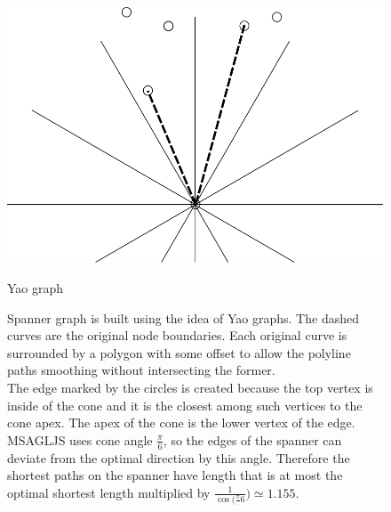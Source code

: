 \documentclass{gd-llncs}
\begin{document}
\begin{figure}[]
  \centering
  \begin{minipage}[b]{0.5\textwidth}
    \includegraphics[width=\textwidth]{yao.pdf}
    \caption{\small{Yao graph}}
    \label{fig:yao}
  \end{minipage}

  \vfill
  \begin{minipage}[b]{\textwidth}
    
    \caption{\small{Spanner graph is built using the idea of Yao graphs. The dashed curves are the original node boundaries. Each original curve is surrounded by a polygon with some offset to allow the polyline paths smoothing without intersecting the former. \\
      The edge marked by the circles is created because the top vertex is inside of the cone and it is the closest among such vertices to the cone apex. The apex of the cone is the lower vertex of the edge. \\MSAGLJS uses cone angle $\frac{\pi}{6}$, so the edges of the spanner can deviate from the optimal direction by this angle. Therefore the shortest paths on the spanner have length that is at most the optimal shortest length multiplied by $\frac{1}{\cos(\frac{\pi}.
        {6}}) \simeq 1.155$.}
    }
    \label{fig:spanner}
  \end{minipage}

\end{figure}
\end{document}
